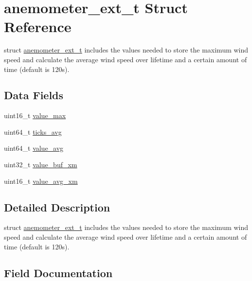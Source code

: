 \hypertarget{structanemometer__ext__t}{}\section{anemometer\+\_\+ext\+\_\+t Struct Reference}
\label{structanemometer__ext__t}


struct \mbox{\hyperlink{structanemometer__ext__t}{anemometer\+\_\+ext\+\_\+t}} includes the values needed to store the maximum wind speed and calculate the average wind speed over lifetime and a certain amount of time (default is 120s).  


\subsection*{Data Fields}
\begin{DoxyCompactItemize}
\item 
uint16\+\_\+t \mbox{\hyperlink{structanemometer__ext__t_a9314254f1bd3f1a5b1512a52470aa8b3}{value\+\_\+max}}
\item 
uint64\+\_\+t \mbox{\hyperlink{structanemometer__ext__t_aa1341800cb84f7a668bdea746835e910}{ticks\+\_\+avg}}
\item 
uint64\+\_\+t \mbox{\hyperlink{structanemometer__ext__t_a4ef73c3a40c5b903c435f93ea8ef5f40}{value\+\_\+avg}}
\item 
uint32\+\_\+t \mbox{\hyperlink{structanemometer__ext__t_ab852894a9785a6e785dc6931927337ff}{value\+\_\+buf\+\_\+xm}}
\item 
uint16\+\_\+t \mbox{\hyperlink{structanemometer__ext__t_a14f62f52081e0c30229f16da4d998d65}{value\+\_\+avg\+\_\+xm}}
\end{DoxyCompactItemize}


\subsection{Detailed Description}
struct \mbox{\hyperlink{structanemometer__ext__t}{anemometer\+\_\+ext\+\_\+t}} includes the values needed to store the maximum wind speed and calculate the average wind speed over lifetime and a certain amount of time (default is 120s). 

\subsection{Field Documentation}
\mbox{\label{structanemometer__ext__t_aa1341800cb84f7a668bdea746835e910}} 
